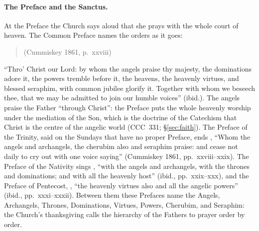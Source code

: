 \paragraph{The Preface and the Sanctus.} At the Preface the Church says
aloud that she prays with the whole court of heaven. The Common Preface
names the orders as it goes:
\begin{quote}
 (Cummiskey 1861, p.~xxviii)
\end{quote}
``Thro' Christ our Lord: by whom the angels praise thy majesty, the
dominations adore it, the powers tremble before it, the heavens, the
heavenly virtues, and blessed seraphim, with common jubilee glorify it.
Together with whom we beseech thee, that we may be admitted to join our
humble voices'' (ibid.). The angels praise the Father ``through Christ'':
the Preface puts the whole heavenly worship under the mediation of the
Son, which is the doctrine of the Catechism that Christ is the centre of
the angelic world (CCC~331; \S\ref{sec:faith}). The Preface of the
Trinity, said on the Sundays that have no proper Preface, ends
, ``Whom the angels
and archangels, the cherubim also and seraphim praise: and cease not
daily to cry out with one voice saying'' (Cummiskey 1861, pp.~xxviii--xxix).
The Preface of the Nativity sings ,
``with the angels and archangels, with the thrones and dominations; and
with all the heavenly host'' (ibid., pp.~xxix--xxx), and the Preface of
Pentecost, , ``the
heavenly virtues also and all the angelic powers'' (ibid.,
pp.~xxxi--xxxii). Between them these Prefaces name the Angels,
Archangels, Thrones, Dominations, Virtues, Powers, Cherubim, and
Seraphim: the Church's thanksgiving calls the hierarchy of the Fathers
to prayer order by order.


